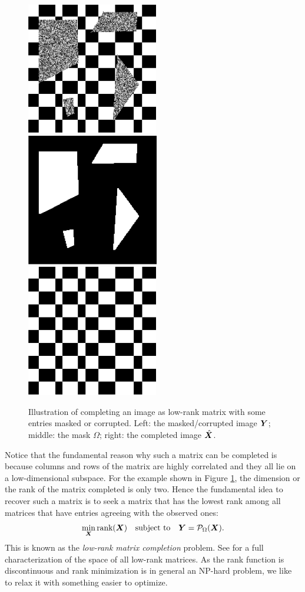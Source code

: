 \documentclass[../../book-main.tex]{subfiles}
\begin{document}
\begin{figure}
\centering
\includegraphics[width=0.3\linewidth]{figs_chap5/masked-checkerboard.png}\;\;
\includegraphics[width=0.3\linewidth]{figs_chap5/mask.png}\;\;
\includegraphics[width=0.3\linewidth]{figs_chap5/checkerboard.png}
\caption{Illustration of  completing an image as low-rank matrix
  with some entries masked or corrupted. Left: the masked/corrupted
image $\bm{Y}$; middle: the mask $\Omega$; right: the completed image $\hat {\bm{X}}$.}
\label{fig:matrix-completion}
\end{figure}

Notice that the fundamental reason why such a matrix can be completed is because columns and rows of the matrix are highly correlated and
they all lie on a low-dimensional subspace. For the example shown in
Figure \ref{fig:matrix-completion}, the dimension or the rank of the matrix completed is only two. Hence the fundamental idea to recover such a matrix is to seek a matrix that has the lowest rank among all
matrices that have entries agreeing with the observed ones:
\begin{equation}
\min_{\bm{X}} \mbox{rank}(\bm{X}) \quad \mbox{subject to}
\quad
\bm{Y} = \mathcal{P}_{\Omega}(\bm{X}).
\label{eqn:rank-min}
\end{equation}
This is known as the {\em low-rank matrix completion} problem. See \cite{Wright-Ma-2022} for a full characterization of the space of all low-rank matrices. As the rank function is discontinuous and rank minimization
is in general an NP-hard problem, we like to relax it with
something easier to optimize.
\end{document}
